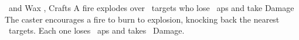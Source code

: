   {\mAir\ and \mFire}%
  {Wax}%
  {\divergent, \duplicated}%
  {Crafts}%
  {A fire explodes over \spellArea\ targets who lose ~\glspl{ap} and take  Damage}%
  {
    The caster encourages a fire to burn to explosion, knocking back the nearest \spellArea\ targets.
    Each one loses ~\glspl{ap} and takes ~Damage.
  }
